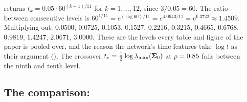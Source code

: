 \begin{example}
\label{ex:schedule}
 returns
$t_k=0.05\cdot60^{(k-1)/11}$ for $k=1,\dots,12$, since $3/0.05=60$. The ratio between
consecutive levels is $60^{1/11}=e^{(\log60)/11}=e^{4.0943/11}=e^{0.3722}\approx1.4509$.
Multiplying out: $0.0500$, $0.0725$, $0.1053$, $0.1527$, $0.2216$, $0.3215$, $0.4665$,
$0.6768$, $0.9819$, $1.4247$, $2.0671$, $3.0000$. These are the levels every table and
figure of the paper is pooled over, and the reason the network's time features take
$\log t$ as their argument (). The crossover
$t_{*}=\tfrac12\log\lambda_{\max}(\mathbf{\Sigma}_0)$ at $\rho=0.85$ falls between the ninth and tenth level.
\end{example}

\subsection{The comparison: }

